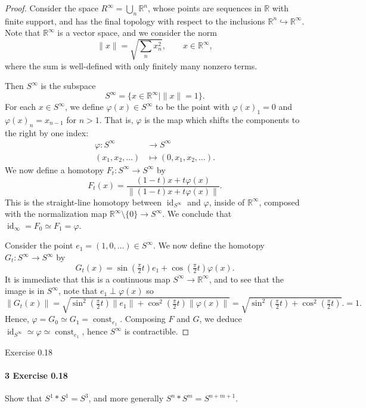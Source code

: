 \documentclass[12pt]{article}
\newlength{\myparskip}
\newenvironment{fullbox}{\begin{lrbox}{\savefullbox}\begin{minipage}{\dimexpr\textwidth-2\fboxsep\relax}\setlength{\parskip}{\myparskip}}{\end{minipage}\end{lrbox}\framebox[\textwidth]{\usebox{\savefullbox}}}
\newenvironment{pbox}[1][]{\begin{fullbox}\ifx#1\empty\else\paragraph{#1}\phantom{}\fi}{\end{fullbox}}
\theoremstyle{definition}
\newcommand{\R}{\mathbb{R}}
\renewcommand{\phi}{\varphi}
\newcommand{\<}{\langle}
\renewcommand{\>}{\rangle}
\DeclareMathOperator{\id}{id}
\newcommand{\inc}{\hookrightarrow}
\newcommand{\htpy}{\simeq}
\DeclareMathOperator{\const}{const}
\begin{document}
\begin{proof}
    Consider the space $R^\infty = \bigcup_n \R^n$, whose points are sequences in $\R$ with finite support, and has the final topology with respect to the inclusions $\R^n \inc \R^\infty$.
    Note that $\R^\infty$ is a vector space, and we consider the norm
    \[\textstyle
        \|x\| = \sqrt{\sum_n x_n^2}, \qquad x \in \R^\infty,
    \]
    where the sum is well-defined with only finitely many nonzero terms.

    Then $S^\infty$ is the subspace
    \[\textstyle
        S^\infty = \{x \in \R^\infty \mid \|x\| = 1\}.
    \]
    For each $x \in S^\infty$, we define $\phi(x) \in S^\infty$ to be the point with $\phi(x)_1 = 0$ and $\phi(x)_n = x_{n-1}$ for $n > 1$.
    That is, $\phi$ is the map which shifts the components to the right by one index:
    \begin{align*}
        \phi : S^\infty &\longrightarrow S^\infty \\
            (x_1, x_2, \dots) &\longmapsto (0, x_1, x_2, \dots).
    \end{align*}
    We now define a homotopy $F_t : S^\infty \to S^\infty$ by
    \[
        F_t(x) = \frac{(1-t)x + t\phi(x)}{\|(1-t)x + t\phi(x)\|}.
    \]
    This is the straight-line homotopy between $\id_{S^\infty}$ and $\phi$, inside of $\R^\infty$, composed with the normalization map $\R^\infty \setminus \{0\} \to S^\infty$.
    We conclude that $\id_{\infty} = F_0 \htpy F_1 = \phi$.

    Consider the point $e_1 = (1, 0, \dots) \in S^\infty$.
    We now define the homotopy $G_t : S^\infty \to S^\infty$ by
    \[
        G_t(x) = \sin(\tfrac{\pi}{2}t)e_1 + \cos(\tfrac{\pi}{2}t)\phi(x).
    \]
    It is immediate that this is a continuous map $S^\infty \to \R^\infty$, and to see that the image is in $S^\infty$, note that $e_1 \perp \phi(x)$ so
    \[
        \|G_t(x)\|
            = \sqrt{\sin^2(\tfrac{\pi}{2}t)\|e_1\| + \cos^2(\tfrac{\pi}{2}t)\|\phi(x)\|}
            = \sqrt{\sin^2(\tfrac{\pi}{2}t) + \cos^2(\tfrac{\pi}{2}t)}.
            = 1.
    \]
    Hence, $\phi = G_0 \htpy G_1 = \const_{e_1}$.
    Composing $F$ and $G$, we deduce $\id_{S^\infty} \htpy \phi \htpy \const_{e_1}$, hence $S^\infty$ is contractible.
\end{proof}




\newpage
\begin{pbox}[3 Exercise 0.18]
    Show that $S^1 * S^1 = S^3$, and more generally $S^n * S^m = S^{n+m+1}$.
\end{pbox}
\end{document}
